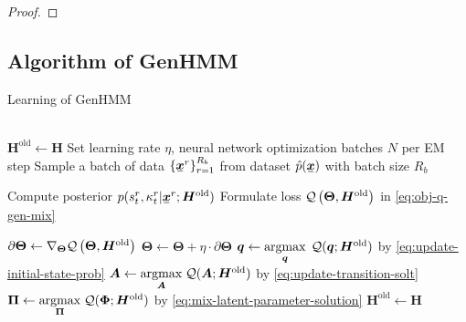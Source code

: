 \documentclass{ecai}
\newcommand{\ubar}[1]{\mkern2mu\underline{\mkern-2mu #1\mkern-2mu}\mkern2mu}
\newcommand{\ubm}[1]{\ubar{\bm{#1}}}
\newcommand{\ubmr}[2]{\ubar{\bm{#1}}^{#2}}
\newcommand{\smtr}[3]{{#1}^{#3}_{#2}}
\begin{document}
\begin{proof}
\end{proof}

\subsection{Algorithm of GenHMM}
\begin{algorithm}[H]
  \caption{Learning of GenHMM}\label{algo:genhmm}
  \begin{algorithmic}[1]
     \\
    \STATE $\bm{H}^{\mathrm{old}} \gets \bm{H}$
    \STATE Set learning rate $\eta$, neural network optimization batches $N$ per EM step
    \STATE Sample a batch of data $\left\{ \ubmr{x}{r} \right\}_{r=1}^{R_b}$ from dataset $\hat{p}(\ubm{x})$ with batch size $R_b$

    \STATE Compute posterior $p(\smtr{s}{t}{r}, \smtr{\kappa}{t}{r}| \ubmr{x}{r}; \bm{H}^{\mathrm{old}})$  
    \STATE Formulate loss ${\mathcal{Q}}\left({\bm{\Theta}}, {\bm{H}}^{\mathrm{old}}\right)$ in \eqref{eq:obj-q-gen-mix}

    \STATE $\partial{\bm{\Theta}} \gets  \nabla_{\bm{\Theta}} {\mathcal{Q}}\left({\bm{\Theta}},{\bm{H}}^{\mathrm{old}}\right)$
    \STATE $\bm{\Theta} \gets \bm{\Theta} + \eta \cdot \partial{\bm{\Theta}}$
    \ENDFOR
    \STATE $\bm{q} \gets \underset{\bm{q}}{\operatorname{argmax}}\;\, \mathcal{Q}(\bm{q}; \bm{H}^{\mathrm{old}})$ by \eqref{eq:update-initial-state-prob}
    \STATE $\bm{A} \gets \underset{\bm{A}}{\operatorname{argmax}}\;\mathcal{Q}(\bm{A}; \bm{H}^{\mathrm{old}})$ by \eqref{eq:update-transition-solt}
    \STATE $\bm{\Pi} \gets \underset{\bm{\Pi}}{\operatorname{argmax}}\;\mathcal{Q}(\bm{\Phi}; \bm{H}^{\mathrm{old}})$ by \eqref{eq:mix-latent-parameter-solution}
    \STATE $\bm{H}^{\mathrm{old}} \gets \bm{H}$
    \ENDFOR
  \end{algorithmic}
\end{algorithm}
\end{document}
